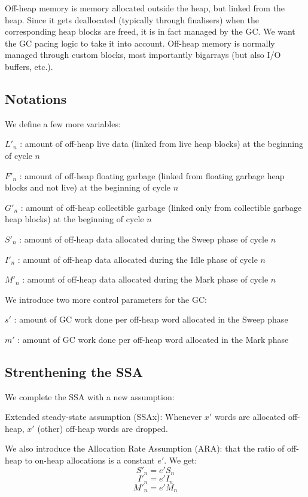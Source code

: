 \documentclass{article}
\begin{document}
Off-heap memory is memory allocated outside the heap, but linked from
the heap. Since it gets deallocated (typically through finalisers)
when the corresponding heap blocks are freed, it is in fact managed by
the GC. We want the GC pacing logic to take it into account. Off-heap
memory is normally managed through custom blocks, most importantly
bigarrays (but also I/O buffers, etc.).

\subsection{Notations}

We define a few more variables:

\bigskip
$L'_n$ : amount of off-heap live data (linked from live
heap blocks) at the beginning of cycle $n$

$F'_n$ : amount of off-heap floating garbage (linked from
floating garbage heap blocks and not live) at the beginning of
cycle $n$

$G'_n$ : amount of off-heap collectible garbage (linked only from
collectible garbage heap blocks) at the beginning of cycle $n$

$S'_n$ : amount of off-heap data allocated during the Sweep phase
of cycle $n$

$I'_n$ : amount of off-heap data allocated during the Idle phase
of cycle $n$

$M'_n$ : amount of off-heap data allocated during the Mark phase
of cycle $n$

\bigskip
\noindent We introduce two more control parameters for the GC:

\bigskip
$s'$ : amount of GC work done per off-heap word allocated
in the Sweep phase

$m'$ : amount of GC work done per off-heap word allocated
in the Mark phase

\subsection{Strenthening the SSA}

We complete the SSA with a new assumption:

Extended steady-state assumption (SSAx): Whenever $x'$ words are
allocated off-heap, $x'$ (other) off-heap words are dropped.

We also introduce the Allocation Rate Assumption (ARA): that the ratio
of off-heap to on-heap allocations is a constant $e'$. We get:
\begin{equation}\label{eqn-S'}
S'_n = e' S_n
\end{equation}
\begin{equation}\label{eqn-I'}
I'_n = e' I_n
\end{equation}
\begin{equation}\label{eqn-M'}
M'_n = e' M_n
\end{equation}
\end{document}
